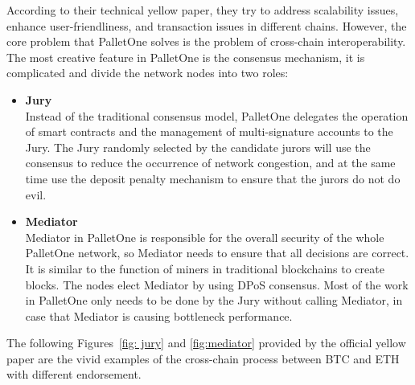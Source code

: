 \noindent According to their technical yellow paper, they try to address scalability issues, enhance user-friendliness, and transaction issues in different chains. However, the core problem that PalletOne solves is the problem of cross-chain interoperability. The most creative feature in PalletOne is the consensus mechanism, it is complicated and divide the network nodes into two roles:
\begin{itemize}
    \item \textbf{Jury} \\
    Instead of the traditional consensus model, PalletOne delegates the operation of smart contracts and the management of multi-signature accounts to the Jury. The Jury randomly selected by the candidate jurors will use the consensus to reduce the occurrence of network congestion, and at the same time use the deposit penalty mechanism to ensure that the jurors do not do evil.
    \item \textbf{Mediator}\\
    Mediator in PalletOne is responsible for the overall security of the whole PalletOne network, so Mediator needs to ensure that all decisions are correct. It is similar to the function of miners in traditional blockchains to create blocks. The nodes elect Mediator by using DPoS consensus. Most of the work in PalletOne only needs to be done by the Jury without calling Mediator, in case that Mediator is causing bottleneck performance.
\end{itemize}
\noindent The following Figures~\ref{fig: jury} and \ref{fig:mediator} provided by the official yellow paper are the vivid examples of the cross-chain process between BTC and ETH with different endorsement.

